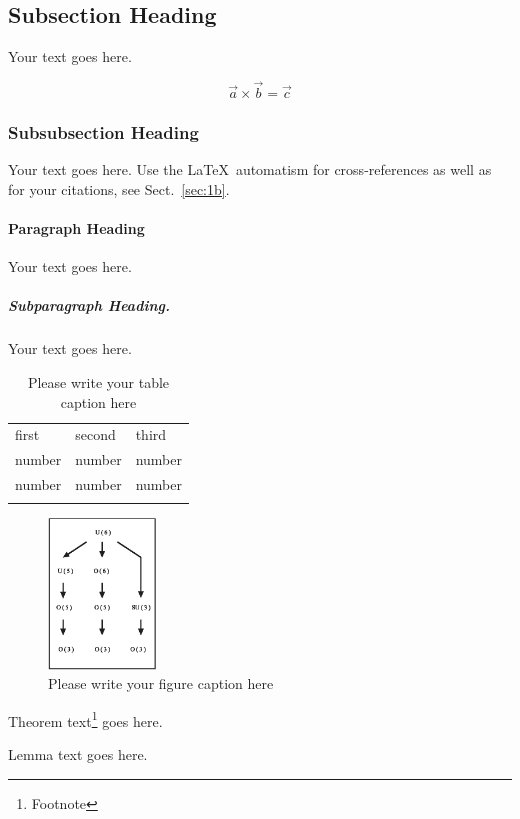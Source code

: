 \subsection{Subsection Heading}
\label{sec:2b}
Your text goes here.

\begin{equation}
\vec{a}\times\vec{b}=\vec{c}
\end{equation}

\subsubsection{Subsubsection Heading}
Your text goes here. Use the \LaTeX\ automatism for cross-references as
well as for your citations, see Sect.~\ref{sec:1b}.

\paragraph{Paragraph Heading} %
Your text goes here.

\subparagraph{Subparagraph Heading.} Your text goes here.%
%
%
%
\begin{table}
\center
\caption{Please write your table caption here}
\label{tab:1b}       %
%
%
\begin{tabular}{lll}
\hline\noalign{\smallskip}
first & second & third  \\
\noalign{\smallskip}\hline\noalign{\smallskip}
number & number & number \\
number & number & number \\
\noalign{\smallskip}\hline
\end{tabular}
\end{table}
%
%
%
\begin{figure}
\center
\includegraphics[height=4cm]{figure.eps}
%
%
\caption{Please write your figure caption here}
\label{fig:1b}       %
\end{figure}
%
%
\begin{theorem}
Theorem text\footnote{Footnote} goes here.
\end{theorem}
%
%
\begin{lemma}
Lemma text goes here.
\end{lemma}
%
%
% 
% 
%



%





